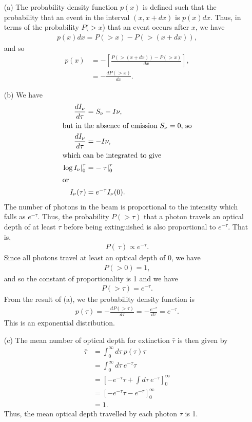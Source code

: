 \newslide

\problemset

\newslide

\begin{problem}
\begin{enumerate}
\item[(a)]
The probability density function $p(x)$ is defined such that  the probability that an event in the interval $(x,x+dx)$ is $p(x)dx$. Thus, in terms of the probability $P(>\!x$) that an event occurs after $x$, we have
\begin{align}
p(x)dx = P(>\!x) - P(>\!(x+dx)),
\end{align}
and so
\begin{align}
p(x) &= - \left[\frac{P(>\!(x+dx)) - P(>\!x)}{dx}\right],\\
&= - \frac{dP(>\!x)}{dx}.
\end{align}
\item[(b)]
We have
\begin{align}
\frac{dI_\nu}{d\tau}&= S_\nu - I\nu,\\
\intertext{but in the absence of emission $S_\nu = 0$, so}
\frac{dI_\nu}{d\tau}&= - I\nu,\\
\intertext{which can be integrated to give}
\left.\log I_\nu\right|_0^\tau &= -\left.\tau\right|_0^\tau\\
\intertext{or}
I_\nu(\tau) &= e^{-\tau}I_\nu(0).
\end{align}
The number of photons in the beam is proportional to the intensity which falls as $e^{-\tau}$. Thus, the probability $P(>\!\tau)$ that a photon travels an optical depth of at least $\tau$ before being extinguished is also proportional to $e^{-\tau}$. That is,
\begin{align}
P(\>\!\tau) \propto e^{-\tau}.
\end{align}
Since all photons travel at least an optical depth of 0, we have 
\begin{align}
P(>\!0) = 1,
\end{align}
and so the constant of proportionality is 1 and we have
\begin{align}
P(>\!\tau) = e^{-\tau}.
\end{align}
From the result of (a), we the probability density function is 
\begin{align}
p(\tau) = -\frac{dP(>\!\tau)}{d\tau} = -\frac{e^{-\tau}}{d\tau} = e^{-\tau}.
\end{align}
This is an exponential distribution.
\item[(c)]
The mean number of optical depth for extinction $\bar\tau$ is then given by
\begin{align}
\bar\tau &=  \int_{0}^\infty\!\!\!d\tau\:p(\tau)\tau\\
&=\int_{0}^\infty\!\!\!d\tau\:e^{-\tau}\tau\\
&=\left[-e^{-\tau}\tau + \int\!\!\!d\tau\:e^{-\tau}\right]_0^\infty\\
&=\left[-e^{-\tau}\tau -e^{-\tau}\right]_0^\infty\\
&=1.
\end{align}
Thus, the mean optical depth travelled by each photon $\bar\tau$ is 1.
\end{enumerate}
\end{problem}

